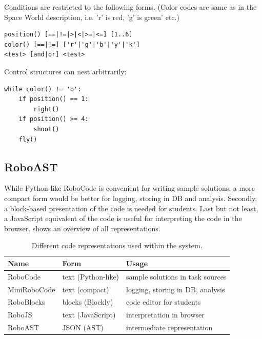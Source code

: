 Conditions %
are restricted to the following forms.
(Color codes are same as in the Space World description,
i.e. 'r' is red, 'g' is green' etc.)
\begin{lstlisting}
position() [==|!=|>|<|>=|<=] [1..6]
color() [==|!=] ['r'|'g'|'b'|'y'|'k']
<test> [and|or] <test>
\end{lstlisting}
Control structures can nest arbitrarily:
\begin{lstlisting}
while color() != 'b':
    if position() == 1:
        right()
    if position() >= 4:
        shoot()
    fly()
\end{lstlisting}


\subsection{RoboAST}

While Python-like RoboCode is convenient for writing sample solutions,
a more compact form would be better for logging, storing in DB and analysis.
Secondly, a block-based presentation of the code is needed for students.
Last but not least, a JavaScript equivalent of the code is useful for
interpreting the code in the browser.
 shows an overview of all representations.


\begin{table}[htb]
\centering
\caption{Different code representations used within the system.}
\begin{tabular}{l l l}
\toprule
Name & Form & Usage  \\
\midrule
RoboCode     & text (Python-like) & sample solutions in task sources  \\
MiniRoboCode & text (compact) & logging, storing in DB, analysis  \\
RoboBlocks   & blocks (Blockly) & code editor for students  \\
RoboJS       & text (JavaScript) & interpretation in browser  \\
RoboAST      & JSON (AST) & intermediate representation \\
\bottomrule
\end{tabular}
\label{tbl:code-representation}
\end{table}

